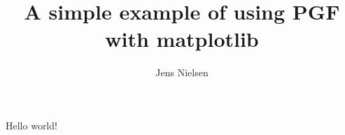 \documentclass{article}
\title{A simple example of using PGF with matplotlib}
\author{Jens Nielsen}
\begin{document}
\maketitle
Hello world!

\end{document}
